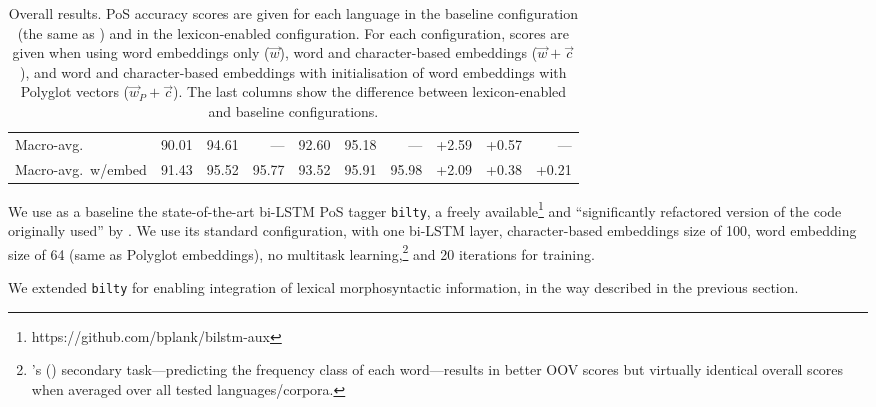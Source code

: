 \documentclass[11pt,letterpaper]{article}
\begin{document}
\begin{table}[t]
\begin{tabular}{l|rrr|rrr|rrr}
\midrule
Macro-avg. & 90.01 & 94.61 & --- & 92.60 & 95.18 & --- & +2.59 & +0.57 & ---\\
Macro-avg.~w/embed & 91.43 & 95.52 & 95.77 & 93.52 & 95.91 & 95.98 & +2.09 & +0.38 & +0.21\\
\end{tabular}
\caption{Overall results. PoS accuracy scores are given for each language in the baseline
  configuration (the same as \citealp{plank16}) and in the lexicon-enabled configuration. For each configuration, scores
are given when using word embeddings only ($\vec{w}$), word and character-based embeddings ($\vec{w}+\vec{c}$), and word
and character-based embeddings with initialisation of word embeddings with Polyglot vectors ($\vec{w}_P+\vec{c}$). The
 last columns show the difference between lexicon-enabled and baseline configurations.{}}\label{tbl:results}
\end{table}

We use as a baseline the state-of-the-art bi-LSTM PoS tagger \texttt{bilty}, a freely
available\footnote{https://github.com/bplank/bilstm-aux} and ``significantly refactored version of the code originally
used'' by \citet{plank16}. We use its standard configuration, with one bi-LSTM layer, character-based embeddings size of
100, word embedding size of 64 (same as Polyglot embeddings), no multitask learning,\footnote{\citeauthor{plank16}'s
  (\citeyear{plank16}) secondary task---predicting the frequency class of each word---results in better OOV scores but
  virtually identical overall scores when averaged over all tested languages/corpora.} and 20 iterations for training.

We extended \texttt{bilty} for enabling integration of lexical morphosyntactic information, in the way described in the
previous section.%
\end{document}
